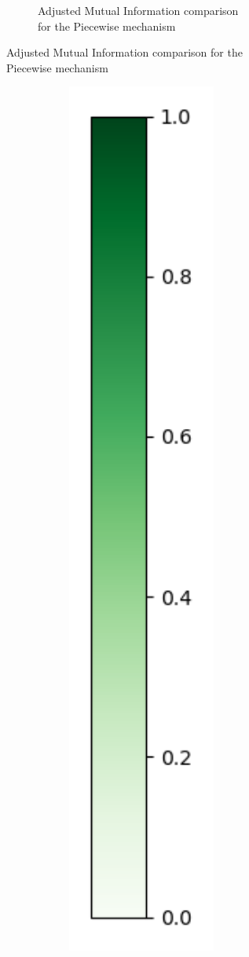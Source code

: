 \begin{figure}[H]
\begin{subfigure}[b]{0.85\textwidth}
\begin{subfigure}[c]{1\textwidth}
            \caption{Adjusted Mutual Information comparison for the Piecewise mechanism}
            \label{fig:ami_heart-dataset_comparison_piecewise_2d}
        \end{subfigure}
    \end{subfigure}
    \hfill %
    \begin{subfigure}[b]{0.075\textwidth}
        \includegraphics[width=1\textwidth]{Results/kd-laplace/kd-Laplace/seeds-dataset/heatmap_legend.png}
    \end{subfigure}
\end{figure}
